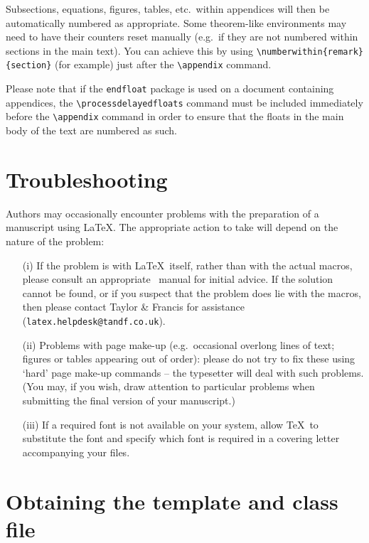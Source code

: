\documentclass[]{interact}
\theoremstyle{plain}%
\theoremstyle{definition}
\theoremstyle{remark}
\begin{document}
\noindent Subsections, equations, figures, tables, etc.\ within appendices will then be automatically numbered as appropriate. Some theorem-like environments may need to have their counters reset manually (e.g.\ if they are not numbered within sections in the main text). You can achieve this by using \verb"\numberwithin{remark}{section}" (for example) just after the \verb"\appendix" command.

Please note that if the \verb"endfloat" package is used on a document containing appendices, the \verb"\processdelayedfloats" command must be included immediately before the \verb"\appendix" command in order to ensure that the floats in the main body of the text are numbered as such.


\appendix

\section{Troubleshooting}

Authors may occasionally encounter problems with the preparation of a manuscript using \LaTeX. The appropriate action to take will depend on the nature of the problem:
\begin{enumerate}
\item[(i)] If the problem is with \LaTeX\ itself, rather than with the actual macros, please consult an appropriate \LaTeXe\ manual for initial advice. If the solution cannot be found, or if you suspect that the problem does lie with the macros, then please contact Taylor \& Francis for assistance (\texttt{latex.helpdesk@tandf.co.uk}).
\item[(ii)] Problems with page make-up (e.g.\ occasional overlong lines of text; figures or tables appearing out of order): please do not try to fix these using `hard' page make-up commands -- the typesetter will deal with such problems. (You may, if you wish, draw attention to particular problems when submitting the final version of your manuscript.)
\item[(iii)] If a required font is not available on your system, allow \TeX\ to substitute the font and specify which font is required in a covering letter accompanying your files.
\end{enumerate}


\section{Obtaining the template and class file}
\end{document}
